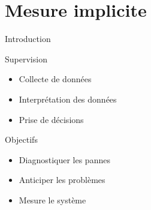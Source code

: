 \section{Mesure implicite} %
\label{sec:supervision_active_&_passive}

\begin{frame}{Introduction}

\begin{block}{Supervision}
  \begin{itemize}
    \item Collecte de données
    \item Interprétation des données
    \item Prise de décisions
  \end{itemize}
\end{block}

\begin{alertblock}{Objectifs}
  \begin{itemize}
    \item Diagnostiquer les pannes
    \item Anticiper les problèmes
    \item Mesure le système
  \end{itemize}
\end{alertblock}


\end{frame}

